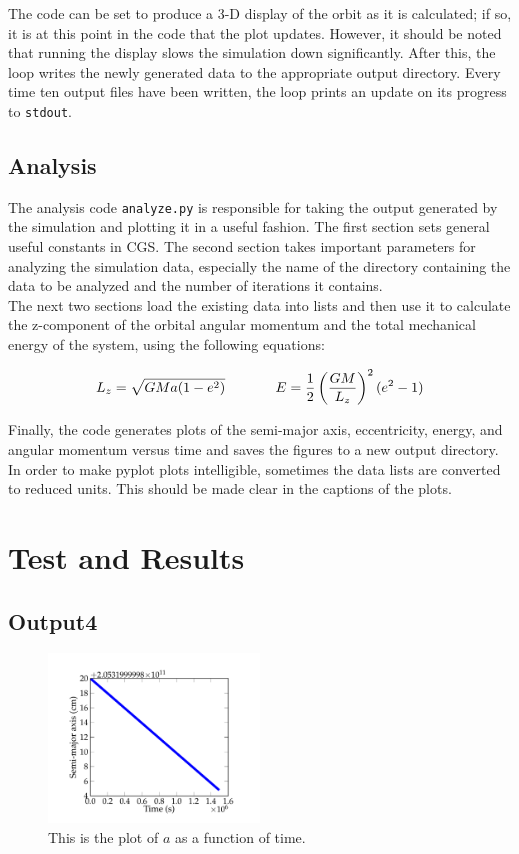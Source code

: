\documentclass[11pt,letterpaper]{article}
\begin{document}
The code can be set to produce a 3-D display of the orbit as it is calculated; if so, it is at this point in the code that the plot updates. However, it should be noted that running the display slows the simulation down significantly. After this, the loop writes the newly generated data to the appropriate output directory. Every time ten output files have been written, the loop prints an update on its progress to \texttt{stdout}.

\subsection{Analysis}

The analysis code \texttt{analyze.py} is responsible for taking the output generated by the simulation and plotting it in a useful fashion. The first section sets general useful constants in CGS. The second section takes important parameters for analyzing the simulation data, especially the name of the directory containing the data to be analyzed and the number of iterations it contains. \\

The next two sections load the existing data into lists and then use it to calculate the z-component of the orbital angular momentum and the total mechanical energy of the system, using the following equations:

$$ L_z = \sqrt{GMa (1 - e^2)} \hspace*{.5in} E = \frac{1}{2} \left( \frac{GM}{L_z} \right)^2 (e^2 - 1) $$

Finally, the code generates plots of the semi-major axis, eccentricity, energy, and angular momentum versus time and saves the figures to a new output directory. In order to make pyplot plots intelligible, sometimes the data lists are converted to reduced units. This should be made clear in the captions of the plots.

\section{Test and Results}

\subsection{Output4}

\begin{figure}[bth]
\centering
\includegraphics[width=0.5\textwidth]{output4_figs/semi-major_axis.pdf}
\caption{This is the plot of $a$ as a function of time.}
\label{fig:simpleplot2}
\end{figure}
\end{document}
